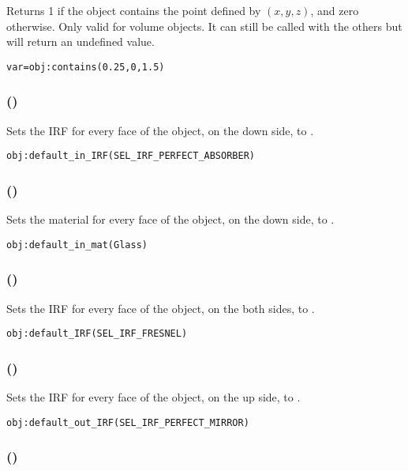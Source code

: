 Returns 1 if the object contains the point defined by $(x,y,z)$, and zero otherwise. Only valid for volume objects. It can still be called with the others but will return an undefined value.
\begin{lstlisting}
var=obj:contains(0.25,0,1.5)
\end{lstlisting}

\subsubsection[default\_in\_IRF]{()}

Sets the IRF for every face of the object, on the down side, to .
\begin{lstlisting}
obj:default_in_IRF(SEL_IRF_PERFECT_ABSORBER)
\end{lstlisting}

\subsubsection[default\_in\_mat]{()}

Sets the material for every face of the object, on the down side, to .
\begin{lstlisting}
obj:default_in_mat(Glass)
\end{lstlisting}

\subsubsection[default\_IRF]{()}

Sets the IRF for every face of the object, on the both sides, to .
\begin{lstlisting}
obj:default_IRF(SEL_IRF_FRESNEL)
\end{lstlisting}

\subsubsection[default\_out\_IRF]{()}

Sets the IRF for every face of the object, on the up side, to .
\begin{lstlisting}
obj:default_out_IRF(SEL_IRF_PERFECT_MIRROR)
\end{lstlisting}

\subsubsection[default\_out\_mat]{()}

